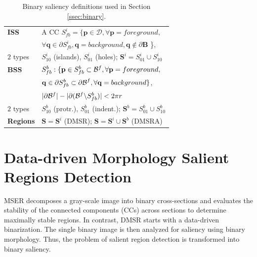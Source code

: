 \documentclass[conference,compsoc]{IEEEtran}
\def\B{{\mathbf B}}
\def\mcD{{\mathcal{D}}}
\def\p{{\mathbf p}}
\def\q{{\mathbf q}}
\def\S{{\mathbf S}}
\begin{document}
\begin{table}[hbt]
\caption{Binary saliency definitions used in Section \ref{ssec:binary}.}\label{table:binary_sal}
\begin{minipage}[b]{0.99\linewidth}\begin{tabular}{|l l|}
\hline
{\bf ISS} & A CC $S^i_{fb} = \{\p \in \mcD, \forall \p=foreground,$\\&$\forall \q \in \partial S^i_{fb}, \q=background, \q \notin \partial \B $ \},\\
$2$ types & $S^i_{10}$ (islands), $S^i_{01}$  (holes); $\S^i = S_{01}^i \cup S_{10}^i$\\
{\bf BSS} &  $S_{fb}^b: \{\p \in S_{fb}^b \subset{\cal B}^f, \forall \p = foreground,$\\&$ \q \in \partial S_{fb}^b \subset {\partial \cal B}^f,\forall \q = background \}$, \\
& $|\partial {\cal B}^f| - |\partial ({\cal B}^f \backslash S_{fb}^b)| < 2 \pi r$\\
$2$ types & $S^b_{10}$ (protr.), $S^b_{01}$ (indent.); $\S^b = S_{01}^b \cup S_{10}^b$\\
{\bf Regions} &  $\S = \S^i$ (DMSR); $\S = \S^i \cup \S^b$ (DMSRA)  \\
\hline
\end{tabular}
\centering
\end{minipage}
\end{table}


\section{Data-driven Morphology Salient Regions Detection}
\label{sec:DMSR}


MSER decomposes a gray-scale image into binary cross-sections and evaluates the stability of the connected components (CCs) across sections to determine maximally stable regions. In contrast, DMSR starts with a data-driven binarization. The single binary image is then analyzed for saliency using binary morphology. Thus, the problem of salient region detection is transformed into binary saliency.
\end{document}
